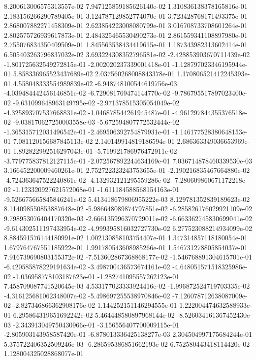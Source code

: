 8.200613006575313557e-02
7.947125859185626140e-02
1.310836138378165816e-01
2.183156266290789405e-01
3.124787129852774070e-01
3.723428768171493375e-01
2.868007882271458309e-01
2.623854223008080799e-01
3.016708733708601264e-01
2.802575726939617873e-01
2.484325465530490273e-01
2.861559341108897980e-01
2.755076834350409509e-01
1.845563538434419615e-01
1.187343982313602414e-01
6.505403263796837032e-02
3.693224308352796581e-02
-2.428853903670711439e-02
-1.801725632549272815e-01
-2.002020237339001418e-01
-1.128797023346195944e-01
5.858336965523437689e-02
2.037560268008843378e-01
1.170806521412245393e-01
4.558048333554989839e-02
-6.948748100544619756e-03
-4.039484442456146851e-02
-6.729081769474144770e-02
-9.786795517897023400e-02
-9.631099648963149795e-02
-2.971378515305054049e-02
-4.325893707537668831e-02
-1.046878544261945487e-01
-4.961297844355376518e-02
-9.038170627250003558e-03
-5.672594807772532444e-02
-1.365315712031496542e-01
-2.469506392754879931e-01
-1.146177528380648153e-01
7.081120156687845113e-02
2.140149914819186594e-01
2.686363349036653969e-01
1.892822992516297043e-01
-5.719921786976472911e-02
-3.779775837812127115e-01
-2.072567892244634169e-01
7.036714878460339530e-03
3.166452200009460261e-01
2.752722323243753655e-01
-2.190216835467664880e-02
-4.724363647522240861e-02
-4.132932121295559286e-02
-7.280609860671172218e-02
-1.123320927621572068e-01
-1.611184588568154163e-01
-9.526675665845846241e-02
5.413418679806955222e-03
8.129781352839189623e-02
8.114098550853887648e-02
-5.986648089874797851e-02
-6.285826176029921109e-02
9.798953076404170320e-03
-2.666135996370729011e-02
-6.663362745830699041e-02
-9.614302511197433954e-02
-4.999395816032727730e-02
6.277523088214934099e-02
8.884591576144180991e-02
1.002130858103754407e-01
1.347314857118180054e-01
1.679764767551185922e-01
1.991780543608985266e-01
1.546731278805854037e-01
7.916739690803155372e-02
-7.513602867368868177e-02
-1.546768891304615701e-01
-6.420585878229191634e-02
-3.498700436573674161e-02
-4.648051571518325986e-02
-1.036958778103187623e-01
-1.282741095557262123e-01
7.458709087741520645e-03
4.533177023333924416e-02
-1.996872524719703335e-02
-4.316125681062348007e-02
-5.498697255538970846e-02
-7.126078712638087009e-02
-2.827346866362908176e-02
1.144252151146294555e-01
1.222004474632588933e-01
6.295864319651692242e-02
5.464448580897968144e-02
-8.526034161367452430e-03
-2.343913049750430966e-01
-3.156556407700009115e-01
-2.805903143958587420e-01
-6.878013336425138277e-03
2.304504997175684244e-01
5.375722406352509246e-03
-6.286595386851662193e-02
6.752580443418114420e-02
1.128004325028868077e-01
